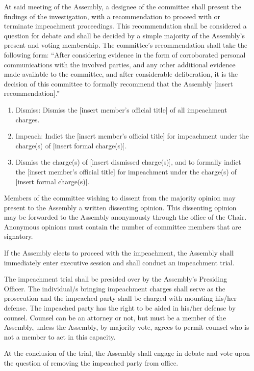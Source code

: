 \begin{bylaws-number}
	\begin{bylaws-number}
		\item At said meeting of the Assembly, a designee of the committee shall present the findings of the investigation, with a recommendation to proceed with or terminate impeachment proceedings. This recommendation shall be considered a question for debate and shall be decided by a simple majority of the Assembly’s present and voting membership. The committee’s recommendation shall take the following form:
		“After considering evidence in the form of corroborated personal communications with the involved parties, and any other additional evidence made available to the committee, and after considerable deliberation, it is the decision of this committee to formally recommend that the Assembly [insert recommendation].”
		\begin{enumerate}[i]
			\item Dismiss: Dismiss the [insert member’s official title] of all impeachment charges.
			\item Impeach: Indict the [insert member’s official title] for impeachment under the charge(s) of [insert formal charge(s)].
			\item Dismiss the charge(s) of [insert dismissed charge(s)], and to formally indict the [insert member’s official title] for impeachment under the charge(s) of [insert formal charge(s)].
		\end{enumerate}
		\item Members of the committee wishing to dissent from the majority opinion may present to the Assembly a written dissenting opinion. This dissenting opinion may be forwarded to the Assembly anonymously through the office of the Chair. Anonymous opinions must contain the number of committee members that are signatory.
		\item If the Assembly elects to proceed with the impeachment, the Assembly shall immediately enter executive session and shall conduct an impeachment trial.
		\item The impeachment trial shall be presided over by the Assembly’s Presiding Officer. The individual/s bringing impeachment charges shall serve as the prosecution and the impeached party shall be charged with mounting his/her defense. The impeached party has the right to be aided in his/her defense by counsel. Counsel can be an attorney or not, but must be a member of the Assembly, unless the Assembly, by majority vote, agrees to permit counsel who is not a member to act in this capacity.
		\item At the conclusion of the trial, the Assembly shall engage in debate and vote upon the question of removing the impeached party from office.

\end{bylaws-number}
\end{bylaws-number}
